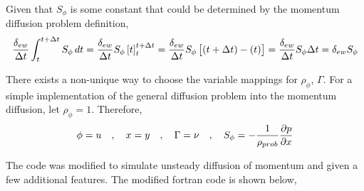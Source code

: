 \documentclass[a4paper, 12pt]{report}
\begin{document}
\begin{center}
Given that $S_{\phi}$ is some constant that could be determined by the momentum diffusion problem definition,
$$\frac{\delta_{ew}}{\Delta t}\int^{t+\Delta t}_{t} S_\phi\,dt = \frac{\delta_{ew}}{\Delta t} S_\phi\left[t\right]^{t+\Delta t}_{t} = \frac{\delta_{ew}}{\Delta t} S_\phi\left[(t+\Delta t) - (t)\right] = \frac{\delta_{ew}}{\Delta t} S_\phi\Delta t = \delta_{ew} S_\phi$$

There exists a non-unique way to choose the variable mappings for $\rho_{\phi}$, $\Gamma$. For a simple implementation of the general diffusion problem into the momentum diffusion, let $\rho_{\phi} = 1$. Therefore,
$$\phi = u \quad,\quad x = y \quad,\quad \Gamma = \nu \quad,\quad S_\phi = -\frac{1}{\rho_{prob}}\frac{\partial p}{\partial x}$$


The code was modified to simulate unsteady diffusion of momentum and given a few additional features. The modified fortran code is shown below,


\end{center}
\end{document}
